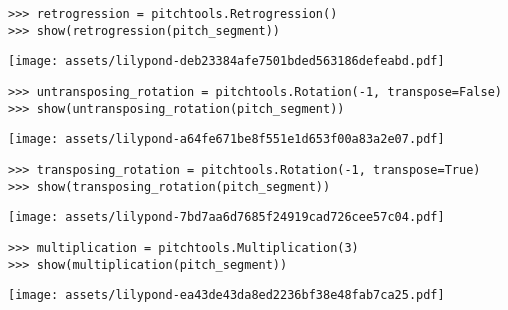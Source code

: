 \begin{comment}
<abjad>
retrogression = pitchtools.Retrogression()
show(retrogression(pitch_segment))
</abjad>
\end{comment}

\begin{abjadbookoutput}
\begin{singlespacing}
\vspace{-0.5\baselineskip}
\begin{lstlisting}
>>> retrogression = pitchtools.Retrogression()
>>> show(retrogression(pitch_segment))
\end{lstlisting}
\noindent\texttt{[image: assets/lilypond-deb23384afe7501bded563186defeabd.pdf]}
\end{singlespacing}
\end{abjadbookoutput}

\begin{comment}
<abjad>
untransposing_rotation = pitchtools.Rotation(-1, transpose=False)
show(untransposing_rotation(pitch_segment))
transposing_rotation = pitchtools.Rotation(-1, transpose=True)
show(transposing_rotation(pitch_segment))
</abjad>
\end{comment}

\begin{abjadbookoutput}
\begin{singlespacing}
\vspace{-0.5\baselineskip}
\begin{lstlisting}
>>> untransposing_rotation = pitchtools.Rotation(-1, transpose=False)
>>> show(untransposing_rotation(pitch_segment))
\end{lstlisting}
\noindent\texttt{[image: assets/lilypond-a64fe671be8f551e1d653f00a83a2e07.pdf]}
\begin{lstlisting}
>>> transposing_rotation = pitchtools.Rotation(-1, transpose=True)
>>> show(transposing_rotation(pitch_segment))
\end{lstlisting}
\noindent\texttt{[image: assets/lilypond-7bd7aa6d7685f24919cad726cee57c04.pdf]}
\end{singlespacing}
\end{abjadbookoutput}

\begin{comment}
<abjad>
multiplication = pitchtools.Multiplication(3)
show(multiplication(pitch_segment))
</abjad>
\end{comment}

\begin{abjadbookoutput}
\begin{singlespacing}
\vspace{-0.5\baselineskip}
\begin{lstlisting}
>>> multiplication = pitchtools.Multiplication(3)
>>> show(multiplication(pitch_segment))
\end{lstlisting}
\noindent\texttt{[image: assets/lilypond-ea43de43da8ed2236bf38e48fab7ca25.pdf]}
\end{singlespacing}
\end{abjadbookoutput}

